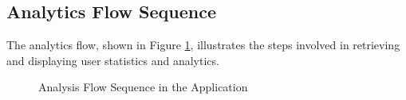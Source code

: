 \subsection{Analytics Flow Sequence}

The analytics flow, shown in Figure \ref{fig:analysis_flow}, illustrates the steps involved in retrieving and displaying user statistics and analytics.

\begin{figure}[ht!]
    \centering
    
    \caption{Analysis Flow Sequence in the Application}
    \label{fig:analysis_flow}
\end{figure}

